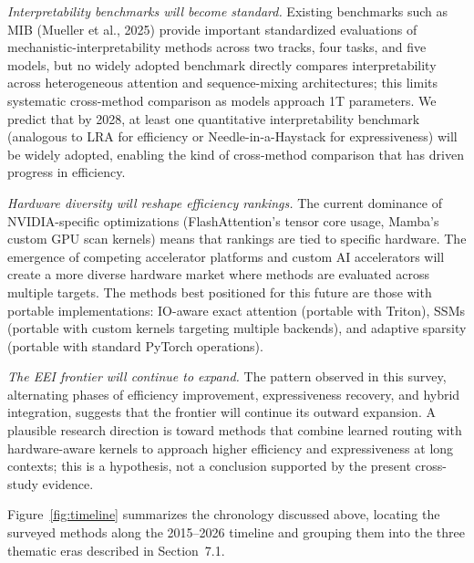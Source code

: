 \documentclass[10pt,twocolumn]{article}
\begin{document}
\textit{Interpretability benchmarks will become standard.} Existing benchmarks such as MIB (Mueller et al., 2025) provide important standardized evaluations of mechanistic-interpretability methods across two tracks, four tasks, and five models, but no widely adopted benchmark directly compares interpretability across heterogeneous attention and sequence-mixing architectures; this limits systematic cross-method comparison as models approach 1T parameters. We predict that by 2028, at least one quantitative interpretability benchmark (analogous to LRA for efficiency or Needle-in-a-Haystack for expressiveness) will be widely adopted, enabling the kind of cross-method comparison that has driven progress in efficiency.

\textit{Hardware diversity will reshape efficiency rankings.} The current dominance of NVIDIA-specific optimizations (FlashAttention's tensor core usage, Mamba's custom GPU scan kernels) means that rankings are tied to specific hardware. The emergence of competing accelerator platforms and custom AI accelerators will create a more diverse hardware market where methods are evaluated across multiple targets. The methods best positioned for this future are those with portable implementations: IO-aware exact attention (portable with Triton), SSMs (portable with custom kernels targeting multiple backends), and adaptive sparsity (portable with standard PyTorch operations).

\textit{The EEI frontier will continue to expand.} The pattern observed in this survey, alternating phases of efficiency improvement, expressiveness recovery, and hybrid integration, suggests that the frontier will continue its outward expansion. A plausible research direction is toward methods that combine learned routing with hardware-aware kernels to approach higher efficiency and expressiveness at long contexts; this is a hypothesis, not a conclusion supported by the present cross-study evidence.

Figure~\ref{fig:timeline} summarizes the chronology discussed above, locating the surveyed methods along the 2015--2026 timeline and grouping them into the three thematic eras described in Section~7.1.
\end{document}

